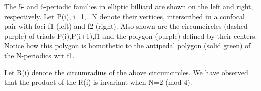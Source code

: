 The 5- and 6-periodic families in elliptic billiard are shown on the left and right, respectively. Let P(i), i=1,...N denote their vertices, interscribed in a confocal pair with foci f1 (left) and f2 (right). Also shown are the circumcircles (dashed purple) of triads P(i),P(i+1),f1 and the polygon (purple)  defined by their centers. Notice how this polygon is homothetic to the antipedal polygon (solid green) of the N-periodics wrt f1.

Let R(i) denote the circumradius of the above circumcircles. We have observed that the product of the R(i) is invariant when N=2 (mod 4).